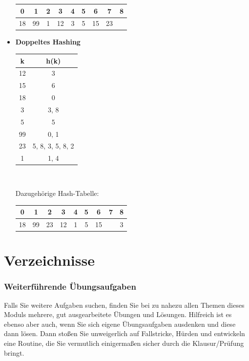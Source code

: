 \documentclass[11pt,a4paper]{scrartcl}
\begin{document}
\begin{itemize}
\begin{center}
\begin{tabular}{|c|c|c|c|c|c|c|c|c|}
\hline
0 & 1 & 2 & 3 & 4 & 5 & 6 & 7 & 8 \\
\hline
18 & 99 & 1 & 12 & 3 & 5 & 15 & 23 & \\
\hline
\end{tabular}
\end{center}
\item \textbf{Doppeltes Hashing}
\begin{center}
\begin{tabular}{|c|c|}
\hline
k & h(k) \\
\hline
12 & 3 \\
15 & 6 \\
18 & 0 \\
3 & 3, 8 \\
5 & 5 \\
99 & 0, 1 \\
23 & 5, 8, 3, 5, 8, 2 \\
1 & 1, 4 \\
\hline
\end{tabular} \\
\end{center} 
Dazugehörige Hash-Tabelle:
\begin{center}
\begin{tabular}{|c|c|c|c|c|c|c|c|c|}
\hline
0 & 1 & 2 & 3 & 4 & 5 & 6 & 7 & 8 \\
\hline
18 & 99 & 23 & 12 & 1 & 5 & 15 & & 3 \\
\hline
\end{tabular}
\end{center}
\end{itemize}
\pagebreak
\part{Verzeichnisse}
\listoftables
\listoffigures
\section*{Weiterführende Übungsaufgaben}
Falls Sie weitere Aufgaben suchen, finden Sie bei \cite{GrUeb} zu nahezu allen Themen dieses Moduls mehrere, gut ausgearbeitete Übungen und Lösungen. Hilfreich ist es ebenso aber auch, wenn Sie sich eigene Übungsaufgaben ausdenken und diese dann lösen. Dann stoßen Sie unweigerlich auf Fallstricke, Hürden und entwickeln eine Routine, die Sie vermutlich einigermaßen sicher durch die Klausur/Prüfung bringt.
\printbibliography
\end{document}
